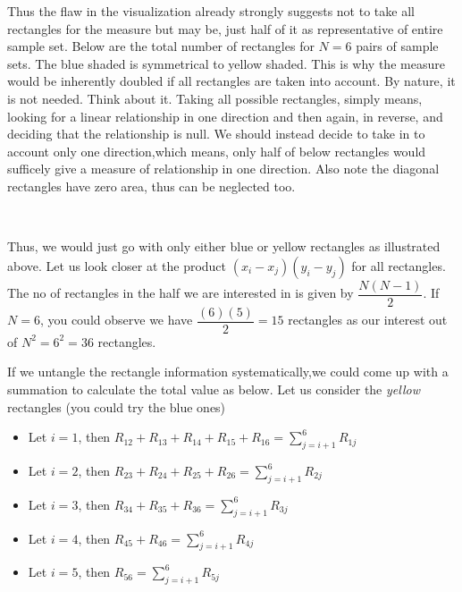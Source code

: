 \documentclass[float=false,crop=false]{standalone}
\begin{document}
    Thus the flaw in the visualization already strongly suggests not to take
all rectangles for the measure but may be, just half of it as
representative of entire sample set. Below are the total number of
rectangles for \(N=6\) pairs of sample sets. The blue shaded is
symmetrical to yellow shaded. This is why the measure would be
inherently doubled if all rectangles are taken into account. By nature,
it is not needed. Think about it. Taking all possible rectangles, simply
means, looking for a linear relationship in one direction and then
again, in reverse, and deciding that the relationship is null. We should
instead decide to take in to account only one direction,which means,
only half of below rectangles would sufficely give a measure of
relationship in one direction. Also note the diagonal rectangles have
zero area, thus can be neglected too.
    \begin{center}
    \end{center}
    { \hspace*{\fill} \\}
    
    Thus, we would just go with only either blue or yellow rectangles as
illustrated above. Let us look closer at the product
\((x_i-x_j)(y_i-y_j)\) for all rectangles. The no of rectangles in the
half we are interested in is given by \(\dfrac{N(N-1)}{2}\). If \(N=6\),
you could observe we have \(\dfrac{(6)(5)}{2} = 15\) rectangles as our
interest out of \(N^2 = 6^2 = 36\) rectangles.

If we untangle the rectangle information systematically,we could come up
with a summation to calculate the total value as below. Let us consider
the \emph{yellow} rectangles (you could try the blue ones)

\begin{itemize}
\tightlist
\item
  Let \(i=1\), then
  \(R_{12} + R_{13} + R_{14} + R_{15} + R_{16} = \sum\limits_{j=i+1}^6R_{1j}\)\\
\item
  Let \(i=2\), then
  \(R_{23} + R_{24} + R_{25} + R_{26} = \sum\limits_{j=i+1}^6R_{2j}\)\\
\item
  Let \(i=3\), then
  \(R_{34} + R_{35} + R_{36} = \sum\limits_{j=i+1}^6R_{3j}\)\\
\item
  Let \(i=4\), then \(R_{45} + R_{46} = \sum\limits_{j=i+1}^6R_{4j}\)\\
\item
  Let \(i=5\), then \(R_{56} = \sum\limits_{j=i+1}^6R_{5j}\)
\end{itemize}
\end{document}

